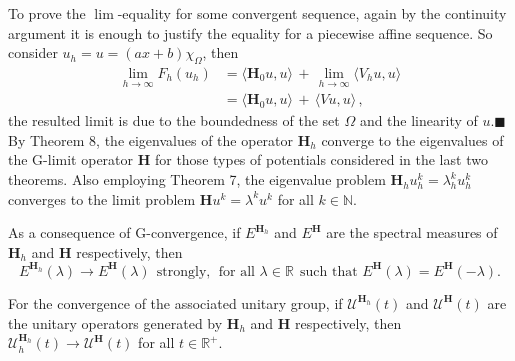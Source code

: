 \documentclass[11pt, epsf]{amsart}
\begin{document}
To prove the $\lim$-equality for some convergent sequence, again by the continuity argument it is enough to justify the equality for a piecewise affine sequence. So consider $u_h=u=(ax+b)\chi_{\Omega}$, then
\begin{equation*}
\begin{array}{ll}
\displaystyle\lim_{h\to\infty}F_h(u_h)&\!\!\!= \langle\mathbf{H}_0u,u\rangle\,+\,\displaystyle \lim_{h\to\infty}\langle V_hu,u\rangle\\
&\!\!\!=\langle\mathbf{H}_0u,u\rangle\,+\,\langle Vu,u\rangle\,,
\end{array}
\end{equation*}
the resulted limit is due to the boundedness of the set $\Omega$ and the linearity of $u$.\hfill{$\blacksquare$}\\

By Theorem 8, the eigenvalues of the operator $\mathbf{H}_h$ converge to the eigenvalues of the G-limit operator $\mathbf{H}$ for those types of potentials considered in the last two theorems. Also employing Theorem 7, the eigenvalue problem $\mathbf{H}_hu_h^k=\lambda_h^ku_h^k$ converges to the limit problem $\mathbf{H}u^k=\lambda^ku^k$ for all $k\in\mathbb{N}$.

As a consequence of G-convergence, if $E^{\mathbf{H}_h}$ and $E^\mathbf{H}$ are the spectral measures of $\mathbf{H}_h$ and $\mathbf{H}$ respectively, then
\begin{equation*}
E^{\mathbf{H}_h}(\lambda)\to\displaystyle E^{\mathbf{H}}(\lambda)\;\,\text{strongly},\;\,\text{for all }\lambda\in\mathbb{R}\;\,\text{such that } E^{\mathbf{H}}(\lambda)=E^{\mathbf{H}}(-\lambda).
\end{equation*}

For the convergence of the associated unitary group, if $\mathcal{U}^{\mathbf{H}_h}(t)$ and $\mathcal{U}^\mathbf{H}(t)$ are the unitary operators generated by $\mathbf{H}_h$ and $\mathbf{H}$ respectively, then $\mathcal{U}_h^{\mathbf{H}_h}(t)\to \mathcal{U}^\mathbf{H}(t)$ for all $t\in \mathbb{R}^+$.
\end{document}
